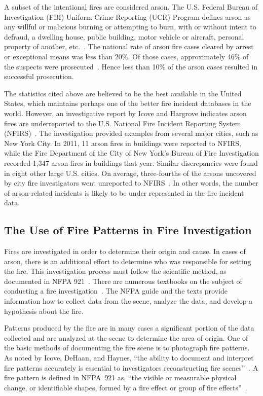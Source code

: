 \documentclass[twoside]{uocthesis}
\begin{document}
A subset of the intentional fires are considered arson.  The U.S. Federal Bureau of Investigation (FBI) Uniform Crime Reporting (UCR) Program defines arson as any willful or malicious burning or attempting to burn, with or without intent to defraud, a dwelling house, public building, motor vehicle or aircraft, personal property of another, etc.~\cite{Crime:2010}.  The national rate of arson fire cases cleared by arrest or exceptional means was less than 20\%.  Of those cases, approximately 46\% of the suspects were prosecuted~\cite{Campbell:2014}.  Hence less than 10\% of the arson cases resulted in successful prosecution.   

The statistics cited above are believed to be the best available in the United States, which maintains perhaps one of the better fire incident databases in the world.  However, an investigative report by Icove and Hargrove indicates arson fires are underreported to the U.S. National Fire Incident Reporting System (NFIRS)~\cite{Icove_2014}.  The investigation provided examples from several major cities, such as New York City. In 2011, 11 arson fires in buildings were reported to NFIRS, while the Fire Department of the City of New York's Bureau of Fire Investigation recorded 1,347 arson fires in buildings that year.  Similar discrepancies were found in eight other large U.S. cities.  On average, three-fourths of the arsons uncovered by city fire investigators went unreported to NFIRS~\cite{Icove_2014}.  In other words, the number of arson-related incidents is likely to be under represented in the fire incident data.  

\subsection{The Use of Fire Patterns in Fire Investigation}
Fires are investigated in order to determine their origin and cause.  In cases of arson, there is an additional effort to determine who was responsible for setting the fire.  This investigation process must follow the scientific method, as documented in NFPA 921~\cite{NFPA:921}.  There are numerous textbooks on the subject of conducting a fire investigation~\cite{Almirall:2004,Fire_Investigation,DeHaan:2012,Icove:2013,Lentini:2006,Noon:1995}. The NFPA guide and the texts provide information how to collect data from the scene, analyze the data, and develop a hypothesis about the fire.

Patterns produced by the fire are in many cases a significant portion of the data collected and are analyzed at the scene to determine the area of origin.  One of the basic methods of documenting the fire scene is to photograph fire patterns.  As noted by Icove, DeHaan, and Haynes,  ``the ability to document and interpret fire patterns accurately is essential to investigators reconstructing fire scenes''~\cite{Icove:2013}.  A fire pattern is defined in NFPA~921 as, ``the visible or measurable physical change, or identifiable shapes, formed by a fire effect or group of fire effects''~\cite{NFPA:921}.
\end{document}
